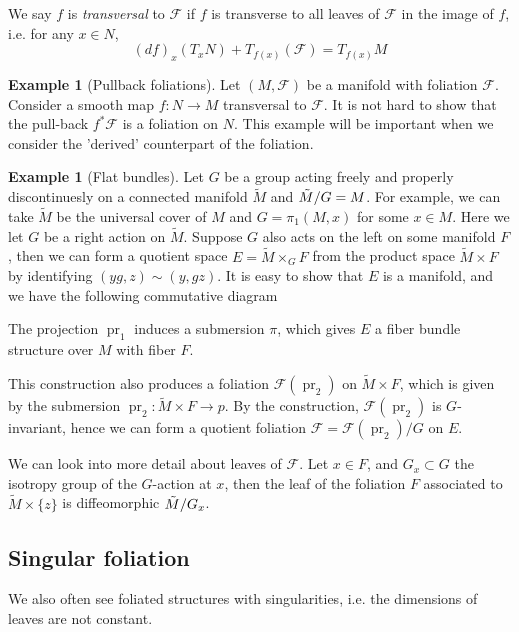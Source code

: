 \documentclass[12pt]{amsart}
\theoremstyle{definition}
\newtheorem{example}[thm]{Example}
\theoremstyle{remark}
\numberwithin{equation}{section}
\newcommand{\CF}{{\mathcal F}}
\newcommand{\1}{{\mathbb{1}}}
\newcommand{\pr}{{\operatorname{pr}}}
\begin{document}
We say $f$ is {\it transversal} to $\CF$ if $f$ is transverse to all leaves of $\CF$ in the image of $f$, i.e. for any $x\in N$,
$$
(df)_x(T_xN) + T_{f(x)}(\CF) = T_{f(x)} M
$$
\begin{example}[Pullback foliations]
Let $(M, \CF)$ be a manifold with foliation $\CF$. Consider a smooth map $f: N\to M$ transversal to $\CF$. It is not hard to show that the pull-back $f^*\CF$ is a foliation on $N$. This example will be important when we consider the 'derived' counterpart of the foliation.
\end{example}
\begin{example}[Flat bundles]
    Let $G$ be a group acting freely and properly discontinuesly on a connected manifold $\tilde{M}$ and $\Tilde{M}/G = M$. For example, we can take $\tilde{M}$  be the universal cover of $M$ and $G = \pi_1(M, x)$ for some $x\in M$. Here we let $G$ be a right action on $\tilde{M}$. Suppose $G$ also acts on the left on some manifold $F$, then we can form a quotient space $E = \tilde{M}\times_G F$ from the product space $\tilde{M}\times F$ by identifying $(yg,z)\sim (y, gz)$. It is easy to show that $E$ is a manifold, and we have the following commutative diagram
    \begin{center}
    \end{center}
    The projection $\pr_1$ induces a submersion $\pi$, which gives $E$ a fiber bundle structure over $M$ with fiber $F$.
    
    This construction also produces a foliation $\CF(\pr_2)$ on $\tilde{M}\times F $, which is given by the submersion $\pr_2: \tilde{M}\times F \to p$. By the construction, $\CF(\pr_2)$ is $G$-invariant, hence we can form a quotient foliation $\CF = \CF(\pr_2)/G$ on $E$. 
    
    We can look into more detail about leaves of $\CF$. Let $x \in F$, and $G_x\subset G$ the isotropy group of the $G$-action at $x$, then the leaf of the foliation $F$ associated to $\tilde{M}\times \{z\}$ is diffeomorphic $\Tilde{M}/G_x$.
    
    
\end{example}
\subsection{Singular foliation}
We also often see foliated structures with singularities, i.e. the dimensions of leaves are not constant.
\end{document}
